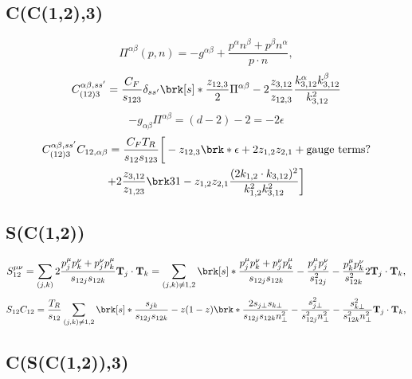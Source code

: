 \documentclass[11pt,a4paper]{article}
\renewcommand{\dim}[0]{d}
\newcommand{\eps}[0]{\epsilon}
\newcommand{\colorT}[1]{\mathbf{T}_{#1}}
\begin{document}
\subsection{C(C(1,2),3)}

\begin{equation}
	\Pi^{\alpha\beta}(p, n) =
	-g^{\alpha\beta}
	+ \frac{p^\alpha n^\beta + p^\beta n^\alpha}{p \cdot n},
\end{equation}
\begin{equation}
	C_{(12)3}^{\alpha\beta,ss'} = \frac{C_F}{s_{123}}
	\delta_{ss'} \brk[s]*{
		\frac{z_{12,3}}{2} \Pi^{\alpha\beta}
		- 2 \frac{z_{3,12}}{z_{12,3}}
		\frac{k_{3,12}^\alpha k_{3,12}^\beta}{k_{3,12}^2}
	}
\end{equation}
\begin{equation}
	-g_{\alpha\beta} \Pi^{\alpha\beta}
	= (\dim-2) - 2
	= - 2 \eps
\end{equation}
\begin{multline}
	C_{(12)3}^{\alpha\beta,ss'} C_{12,\alpha\beta}
	= \frac{C_FT_R}{s_{12}s_{123}} \bigg[
		- z_{12,3} \brk*{\eps + 2 z_{1,2} z_{2,1} + \text{gauge terms?}}
		\\
		+ 2 \frac{z_{3,12}}{z_{1,23}} \brk3{
			1 - z_{1,2} z_{2,1}
			\frac{(2k_{1,2}\cdot k_{3,12})^2}{k_{1,2}^2 k_{3,12}^2}
		}
	\bigg]
\end{multline}


\subsection{S(C(1,2))}

\begin{equation}
	S_{12}^{\mu\nu}
	= \sum_{(j,k)}
	2 \frac{p_j^\mu p_k^\nu + p_j^\nu p_k^\mu}{s_{12j} s_{12k}}
	\colorT{j}\cdot\colorT{k}
	= \sum_{(j,k) \ne 1, 2} \brk[s]*{
		\frac{p_j^\mu p_k^\nu + p_j^\nu p_k^\mu}{s_{12j} s_{12k}}
		- \frac{p_j^\mu p_j^\nu}{s_{12j}^2}
		- \frac{p_k^\mu p_k^\nu}{s_{12k}^2}
	} 2 \colorT{j}\cdot\colorT{k},
\end{equation}
\begin{equation}
	S_{12} C_{12} = \frac{T_R}{s_{12}} \sum_{(j,k) \ne 1, 2} \brk[s]*{
		\frac{s_{jk}}{s_{12j}s_{12k}}
		-z(1-z)\brk*{
		\frac{2 s_{j\perp} s_{k\perp}}{s_{12j} s_{12k} n_\perp^2}
		- \frac{s_{j\perp}^2}{s_{12j}^2 n_\perp^2}
		- \frac{s_{k\perp}^2}{s_{12k}^2 n_\perp^2}
		}
	} \colorT{j}\cdot\colorT{k},
\end{equation}


\subsection{C(S(C(1,2)),3)}
\end{document}
